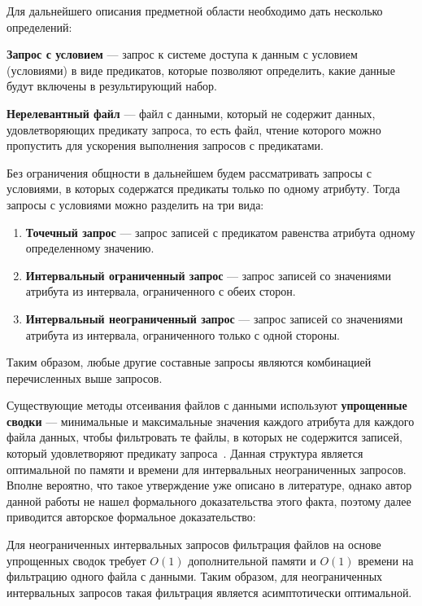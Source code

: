 Для дальнейшего описания предметной области необходимо дать несколько определений:
\begin{definition}\label{def:conditional_query}
    \textbf{Запрос с условием} --- запрос к системе доступа к данным с условием (условиями) в виде предикатов, которые позволяют определить, какие данные будут включены в результирующий набор.
\end{definition}
\begin{definition}\label{def:useless_file}
    \textbf{Нерелевантный файл} --- файл с данными, который не содержит данных, удовлетворяющих предикату запроса, то есть файл, чтение которого можно пропустить для ускорения выполнения запросов с предикатами.
\end{definition}

Без ограничения общности в дальнейшем будем рассматривать запросы с условиями, в которых содержатся предикаты только по одному атрибуту. Тогда запросы с условиями можно разделить на три вида:
\begin{enumerate}
    \item \textbf{Точечный запрос} ---  запрос записей с предикатом равенства атрибута одному определенному значению.
    \item \textbf{Интервальный ограниченный запрос} --- запрос записей со значениями атрибута из интервала, ограниченного с обеих сторон.
    \item \textbf{Интервальный неограниченный запрос} --- запрос записей со значениями атрибута из интервала, ограниченного только с одной стороны.
\end{enumerate}
Таким образом, любые другие составные запросы являются комбинацией перечисленных выше запросов.

Существующие методы отсеивания файлов с данными используют \textbf{упрощенные сводки} --- минимальные и максимальные значения каждого атрибута для каждого файла данных, чтобы фильтровать те файлы, в которых не содержится записей, который удовлетворяют предикату запроса~\cite{Extensible_data_skipping, Small_Materialized_Aggregates}. Данная структура является оптимальной по памяти и времени для интервальных неограниченных запросов. Вполне вероятно, что такое утверждение уже описано в литературе, однако автор данной работы не нашел формального доказательства этого факта, поэтому далее приводится авторское формальное доказательство:
\begin{theorem}\label{theorema}
    Для неограниченных интервальных запросов фильтрация файлов на основе упрощенных сводок требует $O(1)$ дополнительной памяти и $O(1)$ времени на фильтрацию одного файла с данными. Таким образом, для неограниченных интервальных запросов такая фильтрация является асимптотически оптимальной.
\end{theorem}
\proof

